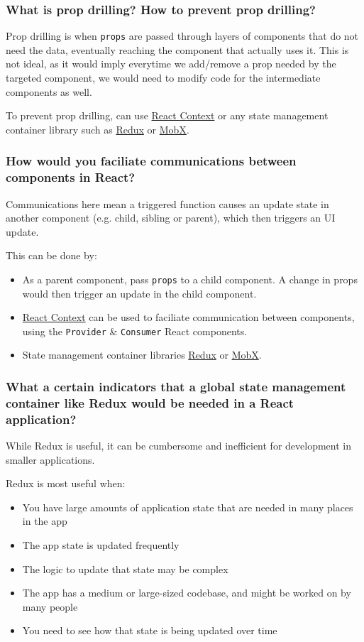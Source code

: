 \documentclass[12pt, a4paper]{article}
\newcommand{\code}[1]{\texttt{#1}}
\begin{document}
\subsubsection*{What is prop drilling? How to prevent prop drilling?}
Prop drilling is when \code{props} are passed through layers of components that do not need the data, eventually reaching the component that actually uses it.
This is not ideal, as it would imply everytime we add/remove a prop needed by the targeted component, we would need to modify code for the intermediate components as well.

To prevent prop drilling, can use \href{https://reactjs.org/docs/context.html}{React Context} or any state management container library such as \href{https://redux.js.org/introduction/getting-started}{Redux} or \href{https://mobx.js.org/README.html}{MobX}.

\subsubsection*{How would you faciliate communications between components in React?}
Communications here mean a triggered function causes an update state in another component (e.g. child, sibling or parent), which then triggers an UI update.

This can be done by:
\begin{itemize}
  \item As a parent component, pass \code{props} to a child component.
        A change in props would then trigger an update in the child component.
  \item \href{https://reactjs.org/docs/context.html}{React Context} can be used to faciliate communication between components, using the \code{Provider} \& \code{Consumer} React components.
  \item State management container libraries \href{https://redux.js.org/introduction/getting-started}{Redux} or \href{https://mobx.js.org/README.html}{MobX}.
\end{itemize}

\subsubsection*{What a certain indicators that a global state management container like Redux would be needed in a React application?}
While Redux is useful, it can be cumbersome and inefficient for development in smaller applications.

Redux is most useful when:
\begin{itemize}
  \item You have large amounts of application state that are needed in many places in the app
  \item The app state is updated frequently
  \item The logic to update that state may be complex
  \item The app has a medium or large-sized codebase, and might be worked on by many people
  \item You need to see how that state is being updated over time
\end{itemize}
\end{document}
